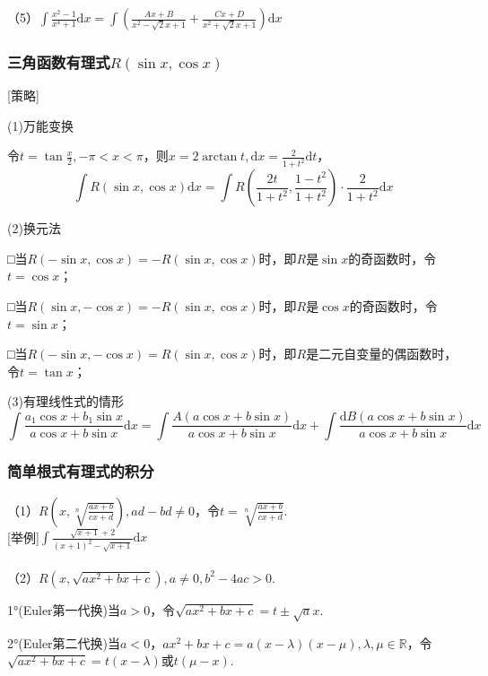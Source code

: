 \documentclass{SCIS2020cn}
\begin{document}
（5）$\displaystyle\int{\frac{x^2-1}{x^4+1}}\text{d}x=\int{\left(\frac{Ax+B}{x^2-\sqrt{2}x+1}+\frac{Cx+D}{x^2+\sqrt{2}x+1}\right)\text{d}x}$\\
\subsubsection{三角函数有理式$R(\sin{x},\cos{x})$}
[策略]

(1)万能变换

令$\displaystyle{}t=\tan{\frac{x}{2},-\pi<x<\pi}$，则$\displaystyle{}x=2\arctan{t},\text{d}x=\frac{2}{1+t^2}\text{d}t$，
\begin{equation}
\int{R(\sin{x},\cos{x})}\text{d}x=\int{R\left(\frac{2t}{1+t^2},\frac{1-t^2}{1+t^2}\right)·\frac{2}{1+t^2}}\text{d}x
\end{equation}

(2)换元法

□当$R(-\sin{x},\cos{x})=-R(\sin{x},\cos{x})$时，即$R$是$\sin{x}$的奇函数时，令$t=\cos{x}$；

□当$R(\sin{x},-\cos{x})=-R(\sin{x},\cos{x})$时，即$R$是$\cos{x}$的奇函数时，令$t=\sin{x}$；

□当$R(-\sin{x},-\cos{x})=R(\sin{x},\cos{x})$时，即$R$是二元自变量的偶函数时，令$t=\tan{x}$；

(3)有理线性式的情形
\begin{equation}
\int{\frac{a_1\cos{x}+b_1\sin{x}}{a\cos{x}+b\sin{x}}}\text{d}x=\int{\frac{A(a\cos{x}+b\sin{x})}{a\cos{x}+b\sin{x}}}\text{d}x+\int{\frac{\text{d}B(a\cos{x}+b\sin{x})}{a\cos{x}+b\sin{x}}}\text{d}x
\end{equation}

\subsubsection{简单根式有理式的积分}

（1）$\displaystyle{}R\left(x,\sqrt[n]{\frac{ax+b}{cx+d}}\right),ad-bd\neq0$，令$\displaystyle{}t=\sqrt[n]{\frac{ax+b}{cx+d}}$.\\

[举例]$\displaystyle\int{\frac{\sqrt{x+1}+2}{(x+1)^2-\sqrt{x+1}}}\text{d}x$\\\\

（2）$R(x,\sqrt{ax^2+bx+c}),a\neq0,b^2-4ac>0.$

1°(Euler第一代换)当$a>0$，令$\sqrt{ax^2+bx+c}=t\pm\sqrt{a}x$.

2°(Euler第二代换)当$a<0$，$ax^2+bx+c=a(x-\lambda)(x-\mu),\lambda,\mu\in\mathbb{R}$，令$\sqrt{ax^2+bx+c}=t(x-\lambda)$或$t(\mu-x)$.\\
\end{document}
